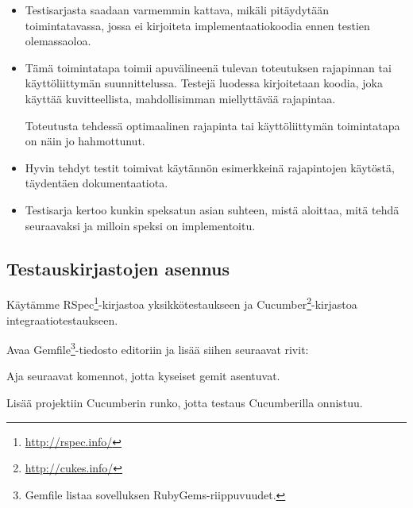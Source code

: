 \documentclass{article}
\begin{document}
\begin{itemize}
  \item
  Testisarjasta saadaan varmemmin kattava, mikäli pitäydytään toimintatavassa,
  jossa ei kirjoiteta implementaatiokoodia ennen testien olemassaoloa.

  \item
  Tämä toimintatapa toimii apuvälineenä tulevan toteutuksen rajapinnan tai
  käyttöliittymän suunnittelussa. Testejä luodessa kirjoitetaan koodia, joka
  käyttää kuvitteellista, mahdollisimman miellyttävää rajapintaa.

  Toteutusta tehdessä optimaalinen rajapinta tai käyttöliittymän toimintatapa
  on näin jo hahmottunut.

  \item
  Hyvin tehdyt testit toimivat käytännön esimerkkeinä rajapintojen käytöstä,
  täydentäen dokumentaatiota.

  \item
  Testisarja kertoo kunkin speksatun asian suhteen, mistä aloittaa, mitä tehdä
  seuraavaksi ja milloin speksi on implementoitu.
\end{itemize}

\subsection{Testauskirjastojen asennus}

Käytämme RSpec\footnote{\url{http://rspec.info/}}-kirjastoa yksikkötestaukseen
ja Cucumber\footnote{\url{http://cukes.info/}}-kirjastoa
integraatiotestaukseen.

\begin{samepage}
  Avaa Gemfile\footnote{Gemfile listaa sovelluksen
  RubyGems-riippuvuudet.}-tiedosto editoriin ja lisää siihen seuraavat rivit:

\end{samepage}

\begin{samepage}
  Aja seuraavat komennot, jotta kyseiset gemit asentuvat.

\end{samepage}

\begin{samepage}
  Lisää projektiin Cucumberin runko, jotta testaus Cucumberilla onnistuu.

\end{samepage}
\end{document}
